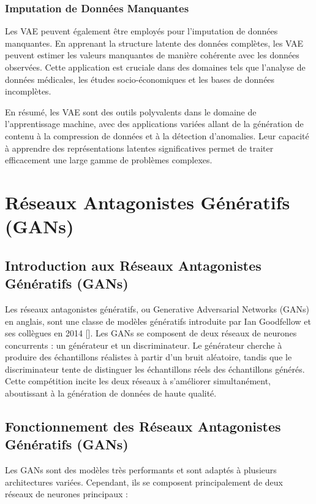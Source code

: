 \subsubsection{Imputation de Données Manquantes}

Les VAE peuvent également être employés pour l'imputation de données
manquantes. En apprenant la structure latente des données complètes, les VAE
peuvent estimer les valeurs manquantes de manière cohérente avec les données
observées. Cette application est cruciale dans des domaines tels que l'analyse
de données médicales, les études socio-économiques et les bases de données
incomplètes.

En résumé, les VAE sont des outils polyvalents dans le domaine de
l'apprentissage machine, avec des applications variées allant de la génération
de contenu à la compression de données et à la détection d'anomalies. Leur
capacité à apprendre des représentations latentes significatives permet de
traiter efficacement une large gamme de problèmes complexes.

\section{Réseaux Antagonistes Génératifs (GANs)}

\subsection{Introduction aux Réseaux Antagonistes Génératifs (GANs)}

Les réseaux antagonistes génératifs, ou Generative Adversarial Networks (GANs)
en anglais, sont une classe de modèles génératifs introduite par Ian Goodfellow
et ses collègues en 2014 [\cite{goodfellow2014generative}]. Les GANs se
composent de deux réseaux de neurones concurrents : un générateur et un
discriminateur. Le générateur cherche à produire des échantillons réalistes à
partir d'un bruit aléatoire, tandis que le discriminateur tente de distinguer
les échantillons réels des échantillons générés. Cette compétition incite les
deux réseaux à s'améliorer simultanément, aboutissant à la génération de
données de haute qualité.

\subsection{Fonctionnement des Réseaux Antagonistes Génératifs (GANs)}

Les GANs sont des modèles très performants et sont adaptés à plusieurs
architectures variées. Cependant, ils se composent principalement de deux
réseaux de neurones principaux :

